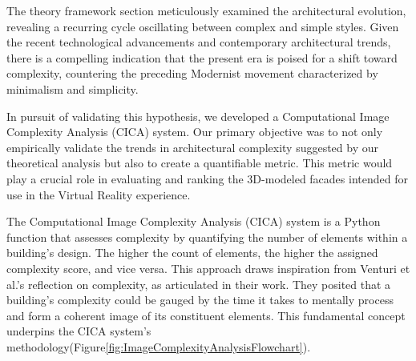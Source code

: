 
The theory framework section meticulously examined the architectural evolution, revealing a recurring cycle oscillating between complex and simple styles.
Given the recent technological advancements and contemporary architectural trends, there is a compelling indication that the present era is poised for a shift toward complexity, countering the preceding Modernist movement characterized by minimalism and simplicity.

In pursuit of validating this hypothesis, we developed a Computational Image Complexity Analysis (CICA) system.
Our primary objective was to not only empirically validate the trends in architectural complexity suggested by our theoretical analysis but also to create a quantifiable metric.
This metric would play a crucial role in evaluating and ranking the 3D-modeled facades intended for use in the Virtual Reality experience.

The Computational Image Complexity  Analysis (CICA) system is a Python function that assesses complexity by quantifying the number of elements within a building's design.
The higher the count of elements, the higher the assigned complexity score, and vice versa.
This approach draws inspiration from Venturi et al.'s reflection on complexity, as articulated in their work\cite{Venturi1977}.
They posited that a building's complexity could be gauged by the time it takes to mentally process and form a coherent image of its constituent elements.
This fundamental concept underpins the CICA system's methodology(Figure\ref{fig:ImageComplexityAnalysisFlowchart}).

